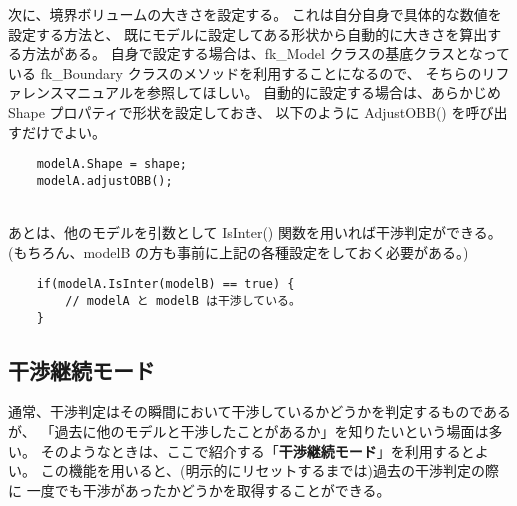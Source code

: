 次に、境界ボリュームの大きさを設定する。
これは自分自身で具体的な数値を設定する方法と、
既にモデルに設定してある形状から自動的に大きさを算出する方法がある。
自身で設定する場合は、fk\_Model クラスの基底クラスとなっている
fk\_Boundary クラスのメソッドを利用することになるので、
そちらのリファレンスマニュアルを参照してほしい。
自動的に設定する場合は、あらかじめ Shape プロパティで形状を設定しておき、
以下のように AdjustOBB() を呼び出すだけでよい。
\\
\begin{breakbox}
\begin{verbatim}
    modelA.Shape = shape;
    modelA.adjustOBB();
\end{verbatim}
\end{breakbox}
~ \\
あとは、他のモデルを引数として IsInter() 関数を用いれば干渉判定ができる。
(もちろん、modelB の方も事前に上記の各種設定をしておく必要がある。)
\\
\begin{breakbox}
\begin{verbatim}
    if(modelA.IsInter(modelB) == true) {
        // modelA と modelB は干渉している。
    }
\end{verbatim}
\end{breakbox}

\subsection{干渉継続モード}
通常、干渉判定はその瞬間において干渉しているかどうかを判定するものであるが、
「過去に他のモデルと干渉したことがあるか」を知りたいという場面は多い。
そのようなときは、ここで紹介する「\textbf{干渉継続モード}」を利用するとよい。
この機能を用いると、(明示的にリセットするまでは)過去の干渉判定の際に
一度でも干渉があったかどうかを取得することができる。

